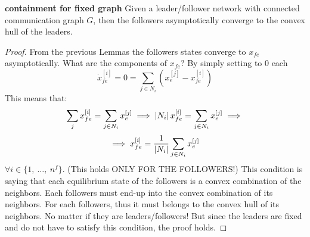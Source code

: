 \begin{thrm}{\textbf{containment for fixed graph}} \newline
Given a leader/follower network with connected communication graph $G$, then the followers asymptotically converge to the convex hull of the leaders.
\end{thrm}

\begin{proof}
From the previous Lemmas the followers states converge to $x_{fe}$ asymptotically. What are the components of $x_{fe}$? By simply setting to 0 each
\[
	\dot{x}_{fe}^{[i]} = 0 = \sum_{j\in N_i}{(x_e^{[j]} - x_{fe}^{[i]})}
\]
This means that:
\[
	\sum_j{x_{fe}^{[i]}} = \sum_{j\in N_i}{x_e^{[j]}} \implies \left\vert{N_i}\right\vert x_{fe}^{[i]} = \sum_{j\in N_i}{x_e^{[j]}} \implies
\]
\[
	\implies x_{fe}^{[i]} = \frac{1}{\left\vert{N_i}\right\vert}\sum_{j\in N_i}{x_e^{[j]}}
\]
$\forall i \in\{1,\ \dots,\ n^f\}$. (This holds ONLY FOR THE FOLLOWERS!) This condition is saying that each equilibrium state of the followers is a convex combination of the neighbors. Each followers must end-up into the convex combination of its neighbors. For each followers, thus it must belongs to the convex hull of its neighbors. No matter if they are leaders/followers! But since the leaders are fixed and do not have to satisfy this condition, the proof holds.
\end{proof}
